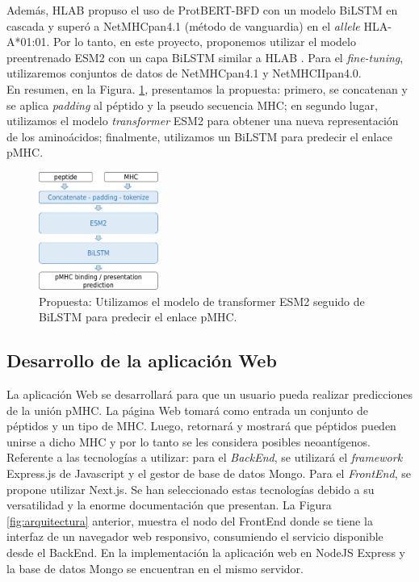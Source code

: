 \documentclass[a4paper]{article}
\begin{document}
Además, HLAB \citep{zhang2022hlab} propuso el uso de ProtBERT-BFD \citep{elnaggar2021prottrans} con un modelo BiLSTM en cascada y superó a NetMHCpan4.1 (método de vanguardia) en el \textit{allele} HLA-A*01:01. Por lo tanto, en este proyecto, proponemos utilizar el modelo preentrenado ESM2 \citep{lin2023evolutionary} con un capa BiLSTM  similar a HLAB \citep{zhang2022hlab}. Para el \textit{fine-tuning}, utilizaremos conjuntos de datos de NetMHCpan4.1 y NetMHCIIpan4.0.\\

En resumen, en la Figura. \ref{fig:proposal}, presentamos la propuesta: primero, se concatenan y se aplica \textit{padding} al péptido y la pseudo secuencia MHC; en segundo lugar, utilizamos el modelo \textit{transformer} ESM2 para obtener una nueva representación de los aminoácidos; finalmente, utilizamos un BiLSTM para predecir el enlace pMHC. 





\begin{figure}[H]
	\centering
	\includegraphics[width=0.35\textwidth]{../img/neoantigen/proposal1}
	\caption{Propuesta: Utilizamos el modelo de transformer ESM2 seguido de BiLSTM para predecir el enlace pMHC.}
	\label{fig:proposal}
\end{figure}

\subsection{Desarrollo de la aplicación Web}

La aplicación Web se desarrollará para que un usuario pueda realizar predicciones de la unión pMHC. La página Web tomará como entrada un conjunto de péptidos y un tipo de MHC. Luego, retornará y mostrará que péptidos pueden unirse a dicho MHC y por lo tanto se les considera posibles neoantígenos.\\

Referente a las tecnologías a utilizar: para el \textit{BackEnd}, se utilizará el \textit{framework} Express.js de Javascript y el gestor de base de datos Mongo. Para el \textit{FrontEnd}, se propone utilizar Next.js. Se han seleccionado estas tecnologías debido a su versatilidad y la enorme documentación que presentan. La Figura \ref{fig:arquitectura} anterior, muestra el nodo del FrontEnd donde se tiene la interfaz de un navegador web responsivo, consumiendo el servicio disponible desde el BackEnd. En la implementación la aplicación web en NodeJS Express y la base de datos Mongo se encuentran en el mismo servidor.
\end{document}
